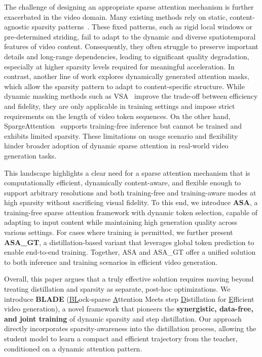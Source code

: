 \documentclass[letterpaper]{article} %
\begin{document}
The challenge of designing an appropriate sparse attention mechanism is further exacerbated in the video domain. Many existing methods rely on static, content-agnostic sparsity patterns~\cite{zhang2025fastvideogenerationsliding,li2025radialattentiononlogn,xi2025sparsevideogenacceleratingvideo}. These fixed patterns, such as rigid local windows or pre-determined striding, fail to adapt to the dynamic and diverse spatiotemporal features of video content. Consequently, they often struggle to preserve important details and long-range dependencies, leading to significant quality degradation, especially at higher sparsity levels required for meaningful acceleration. In contrast, another line of work explores dynamically generated attention masks, which allow the sparsity pattern to adapt to content-specific structure. While dynamic masking methods such as VSA~\cite{zhang2025vsafastervideodiffusion} improve the trade-off between efficiency and fidelity, they are only applicable in training settings and impose strict requirements on the length of video token sequences. On the other hand, SpargeAttention~\cite{zhang2025spargeattentionaccuratetrainingfreesparse} supports training-free inference but cannot be trained and exhibits limited sparsity. These limitations on usage scenario and flexibility hinder broader adoption of dynamic sparse attention in real-world video generation tasks.


This landscape highlights a clear need for a sparse attention mechanism that is computationally efficient, dynamically content-aware, and flexible enough to support arbitrary resolutions and both training-free and training-aware modes at high sparsity without sacrificing visual fidelity. To this end, we introduce \textbf{ASA}, a training-free sparse attention framework with dynamic token selection, capable of adapting to input content while maintaining high generation quality across various settings. For cases where training is permitted, we further present \textbf{ASA\_GT}, a distillation-based variant that leverages global token prediction to enable end-to-end training. Together, ASA and ASA\_GT offer a unified solution to both inference and training scenarios in efficient video generation.



Overall, this paper argues that a truly effective solution requires moving beyond treating distillation and sparsity as separate, post-hoc optimizations. We introduce \textbf{BLADE} (\underline{BL}ock-sparse \underline{A}ttention Meets step \underline{D}istillation for \underline{E}fficient video generation), a novel framework that pioneers the \textbf{synergistic, data-free, and joint training} of dynamic sparsity and step distillation. Our approach directly incorporates sparsity-awareness into the distillation process, allowing the student model to learn a compact and efficient trajectory from the teacher, conditioned on a dynamic attention pattern.
\end{document}
